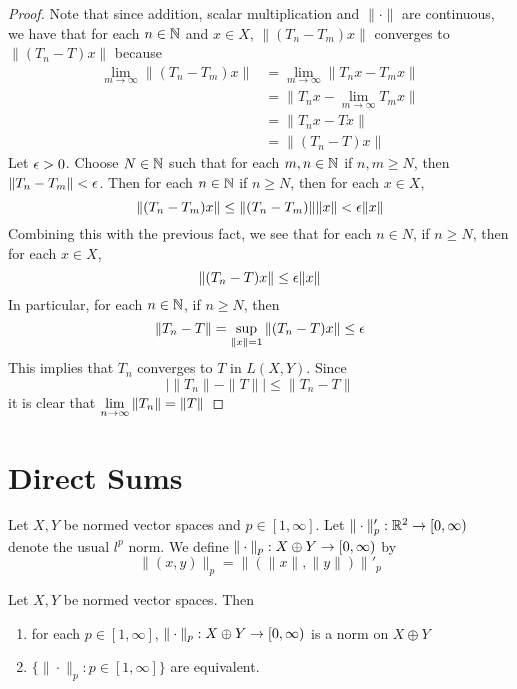 \documentclass{book}
\begin{document}
\begin{proof}
		Note that since addition, scalar multiplication and $\|\cdot \|$ are continuous, we have that for each $n \in \mathbb{N}$ and $x \in X$, $\|(T_n-T_m)x \|$ converges to $\|(T_n-T)x \|$ because 
		\begin{align*}
			\lim_{m \rightarrow \infty} \|(T_n-T_m)x \|
			&= \lim_{m \rightarrow \infty} \|T_nx-T_mx \|\\
			&= \|T_nx-\lim_{m \rightarrow \infty}T_mx \|\\
			&=\|T_nx-Tx \|\\
			&= \|(T_n-T)x \|
		\end{align*} 
		Let $\epsilon >0 $. Choose $N \in \mathbb{N}$ such that for each $m, n \in \mathbb{N}$ if $n,m \geq N$, then $\|T_n - T_m \|< \epsilon$. Then for each $n \in \mathbb{N}$ if $n \geq N$, then for each $x \in X$, $$\|(T_n-T_m)x\|\leq \|(T_n-T_m)\|\|x \|< \epsilon \|x\|$$ Combining this with the previous fact, we see that for each $n \in N$, if $n \geq N$, then for each $x \in X$, $$\|(T_n -T) x\|\leq \epsilon \|x \|$$ In particular, for each $n \in \mathbb{N}$, if $n \geq N$, then $$ \|T_n -T \|= \sup\limits_{\|x \|= 1}\|(T_n - T)x \|\leq \epsilon$$ This implies that $T_n$ converges to $T$ in $L(X,Y)$. 
		Since $$\bigg | \|T_n \|- \|T \|\bigg | \leq \|T_n - T \|$$ it is clear that $\lim \limits_{n \rightarrow \infty} \|T_n \|= \|T \|$
	\end{proof}
	
	
	
	
	
	
	
	
	
	
	
	
	
	
	
	
	
	
	
	
	
	
	
	
	\newpage
	\section{Direct Sums}
	
	\begin{defn} \ld{}
	Let $X, Y$ be normed vector spaces and $p \in [1, \infty]$. Let $\| \cdot \|'_p: \mathbb{R}^2 \rightarrow [0, \infty)$ denote the usual $l^p$ norm. We define $\| \cdot \|_p : X \oplus Y \rightarrow [0,\infty)$ by $$\|(x, y) \|_p = \|( \|x\|, \| y \|) \|'_ p$$
	\end{defn}
	
	\begin{ex} \lex{}	
	Let $X, Y$  be normed vector spaces. Then 
	\begin{enumerate}
	\item for each $p \in [1, \infty]$, $\|\cdot\|_p: X \oplus Y \rightarrow [0,\infty)$ is a norm on $X \oplus Y$
	\item  $\{\|\cdot \|_p:  p \in [1, \infty]\}$ are equivalent. 
	\end{enumerate}
	\end{ex}
	
\end{document}
